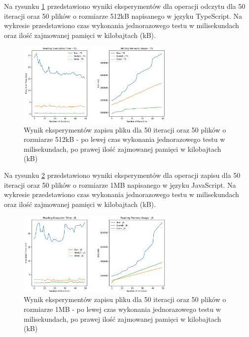 Na rysunku \ref{fig:file_e1_writing_ts} przedstawiono wyniki eksperymentów dla operacji odczytu dla 50 iteracji oraz 50 plików o rozmiarze 512kB napisanego w języku TypeScript. Na wykresie przedstawiono czas wykonania jednorazowego testu w milisekundach oraz ilość zajmowanej pamięci w kilobajtach (kB).

\begin{figure}[H]
  \centering
  \includegraphics[width=0.68\textwidth]{Figures/files/files_writing_50_500_50_ts.png}
  \caption{Wynik eksperymentów zapisu pliku dla 50 iteracji oraz 50 plików o rozmiarze 512kB - po lewej czas wykonania jednorazowego testu w milisekundach, po prawej ilość zajmowanej pamięci w kilobajtach (kB)}
  \label{fig:file_e1_writing_ts}
\end{figure}

Na rysunku \ref{fig:file_e2_reading_js} przedstawiono wyniki eksperymentów dla operacji zapisu dla 50 iteracji oraz 50 plików o rozmiarze 1MB napisanego w języku JavaScript. Na wykresie przedstawiono czas wykonania jednorazowego testu w milisekundach oraz ilość zajmowanej pamięci w kilobajtach (kB).

\begin{figure}[H]
  \centering
  \includegraphics[width=0.68\textwidth]{Figures/files/files_writing_50_2000_50_js.png}
  \caption{Wynik eksperymentów zapisu pliku dla 50 iteracji oraz 50 plików o rozmiarze 1MB - po lewej czas wykonania jednorazowego testu w milisekundach, po prawej ilość zajmowanej pamięci w kilobajtach (kB)}
  \label{fig:file_e2_reading_js}
\end{figure}


